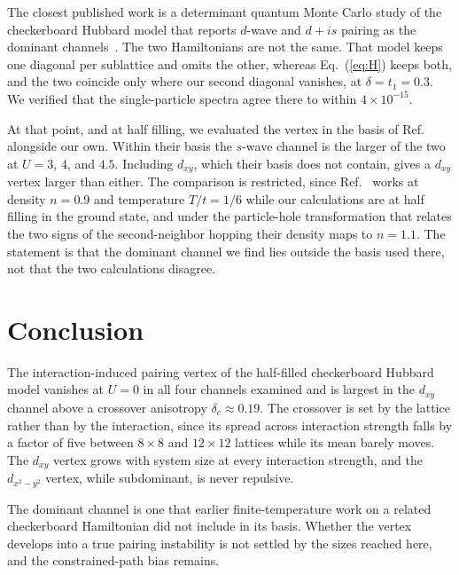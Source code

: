 \documentclass[aps,prb,reprint,superscriptaddress,amsmath,amssymb,floatfix]{revtex4-2}
\begin{document}
The closest published work is a determinant quantum Monte Carlo study of the
checkerboard Hubbard model that reports $d$-wave and $d + is$ pairing as the
dominant channels~\cite{Pan2024}. The two Hamiltonians are not the same. That
model keeps one diagonal per sublattice and omits the other, whereas
Eq.~(\ref{eq:H}) keeps both, and the two coincide only where our second diagonal
vanishes, at $\delta = t_1 = 0.3$. We verified that the single-particle spectra
agree there to within $4\times10^{-15}$.

At that point, and at half filling, we evaluated the vertex in the basis of
Ref.~\cite{Pan2024} alongside our own. Within their basis the $s$-wave channel is
the larger of the two at $U = 3$, $4$, and $4.5$. Including $d_{xy}$, which their
basis does not contain, gives a $d_{xy}$ vertex larger than either.
The comparison is restricted, since Ref.~\cite{Pan2024} works at density
$n = 0.9$ and temperature $T/t = 1/6$ while our calculations are at half filling
in the ground state, and under the particle-hole transformation that relates the
two signs of the second-neighbor hopping their density maps to $n = 1.1$. The
statement is that the dominant channel we find lies outside the basis used there,
not that the two calculations disagree.

\section{Conclusion}

The interaction-induced pairing vertex of the half-filled checkerboard Hubbard
model vanishes at $U = 0$ in all four channels examined and is largest in the
$d_{xy}$ channel above a crossover anisotropy $\delta_c \approx 0.19$. The
crossover is set by the lattice rather than by the interaction, since its spread
across interaction strength falls by a factor of five between $8\times8$ and
$12\times12$ lattices while its mean barely moves. The $d_{xy}$ vertex grows with
system size at every interaction strength, and the $d_{x^2-y^2}$ vertex, while
subdominant, is never repulsive.

The dominant channel is one that earlier finite-temperature work on a related
checkerboard Hamiltonian did not include in its basis. Whether the vertex
develops into a true pairing instability is not settled by the sizes reached
here, and the constrained-path bias remains.
\end{document}
